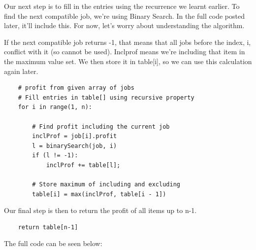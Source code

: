 \documentclass{article}
\begin{document}
Our next step is to fill in the entries using the recurrence we learnt earlier. To find the next compatible job, we're using Binary Search. In the full code posted later, it'll include this. For now, let's worry about understanding the algorithm.

If the next compatible job returns -1, that means that all jobs before the index, i, conflict with it (so cannot be used).  Inclprof means we're including that item in the maximum value set. We then store it in table[i], so we can use this calculation again later.
\begin{verbatim}
    # profit from given array of jobs
	# Fill entries in table[] using recursive property 
	for i in range(1, n): 

		# Find profit including the current job 
		inclProf = job[i].profit 
		l = binarySearch(job, i) 
		if (l != -1): 
			inclProf += table[l]; 

		# Store maximum of including and excluding 
		table[i] = max(inclProf, table[i - 1]) 

\end{verbatim}
Our final step is then to return the profit of all items up to n-1.
\begin{verbatim}
	return table[n-1] 
\end{verbatim}
The full code can be seen below:
\end{document}
